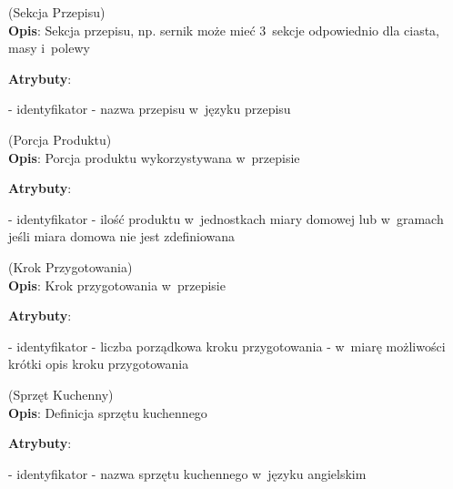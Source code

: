 \begin{enumerate}[label={\textbf{KAT/2/\protect\twodigits{\theenumi}}}, wide, labelwidth=!, labelindent=0pt, labelsep=0pt, series=reqs]
    \label{kat:RecipeSection} (Sekcja Przepisu)\\
    \indent\textbf{Opis}: Sekcja przepisu, np. sernik może mieć 3~sekcje odpowiednio dla ciasta, masy i~polewy
    \par
    \textbf{Atrybuty}:
    \begin{itemize}[series=atr, wide, align=left, leftmargin=190pt]
        \label{kat:RecipeSection:id}- identyfikator
        \label{kat:RecipeSection:sectionName}- nazwa przepisu w~języku przepisu
    \end{itemize}

    \label{kat:ProductPortion} (Porcja Produktu)\\
    \indent\textbf{Opis}: Porcja produktu wykorzystywana w~przepisie
    \par
    \textbf{Atrybuty}:
    \begin{itemize}[series=atr, wide, align=left, leftmargin=190pt]
        \label{kat:ProductPortion:id}- identyfikator
        \label{kat:ProductPortion:amount}- ilość produktu w~jednostkach miary domowej lub w~gramach jeśli miara domowa nie jest zdefiniowana
    \end{itemize}

    \label{kat:PreparationStep} (Krok Przygotowania)\\
    \indent\textbf{Opis}: Krok przygotowania w~przepisie
    \par
    \textbf{Atrybuty}:
    \begin{itemize}[series=atr, wide, align=left, leftmargin=190pt]
        \label{kat:PreparationStep:id}- identyfikator
        \label{kat:PreparationStep:ordinalNumber}- liczba porządkowa kroku przygotowania
        \label{kat:PreparationStep:stepDescription}- w~miarę możliwości krótki opis kroku przygotowania
    \end{itemize}

    \label{kat:KitchenAppliance} (Sprzęt Kuchenny)\\
    \indent\textbf{Opis}: Definicja sprzętu kuchennego
    \par
    \textbf{Atrybuty}:
    \begin{itemize}[series=atr, wide, align=left, leftmargin=190pt]
        \label{kat:KitchenAppliance:id}- identyfikator
        \label{kat:KitchenAppliance:name}- nazwa sprzętu kuchennego w~języku angielskim
    \end{itemize}


\end{enumerate}
